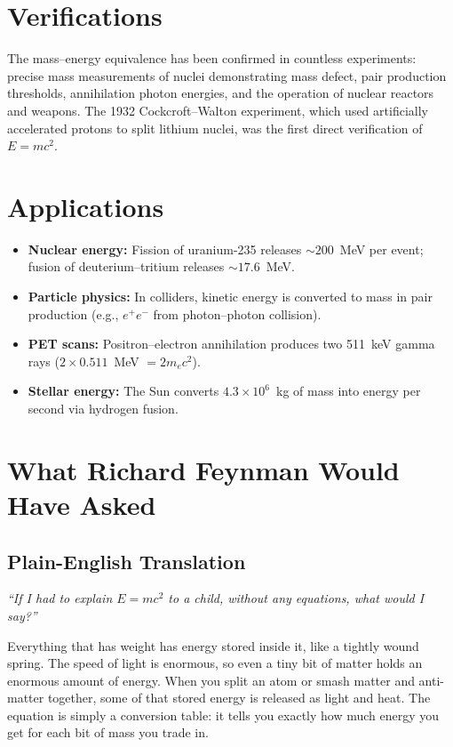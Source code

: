\documentclass[11pt,openright]{book}
\begin{document}
\section*{Verifications}

The mass--energy equivalence has been confirmed in countless experiments: precise mass measurements of nuclei demonstrating mass defect, pair production thresholds, annihilation photon energies, and the operation of nuclear reactors and weapons. The 1932 Cockcroft--Walton experiment, which used artificially accelerated protons to split lithium nuclei, was the first direct verification of $E = mc^{2}$.
\section*{Applications}

\begin{itemize}
  \item \textbf{Nuclear energy:} Fission of uranium-235 releases $\sim 200$~MeV per event; fusion of deuterium--tritium releases $\sim 17.6$~MeV.
  \item \textbf{Particle physics:} In colliders, kinetic energy is converted to mass in pair production (e.g., $e^{+}e^{-}$ from photon--photon collision).
  \item \textbf{PET scans:} Positron--electron annihilation produces two 511~keV gamma rays ($2 \times 0.511$~MeV $= 2m_{e}c^{2}$).
  \item \textbf{Stellar energy:} The Sun converts $4.3 \times 10^{6}$~kg of mass into energy per second via hydrogen fusion.
\end{itemize}
\section*{What Richard Feynman Would Have Asked}

\subsection*{Plain-English Translation}
\textit{``If I had to explain $E = mc^{2}$ to a child, without any equations, what would I say?''}

Everything that has weight has energy stored inside it, like a tightly wound spring. The speed of light is enormous, so even a tiny bit of matter holds an enormous amount of energy. When you split an atom or smash matter and anti-matter together, some of that stored energy is released as light and heat. The equation is simply a conversion table: it tells you exactly how much energy you get for each bit of mass you trade in.
\end{document}
